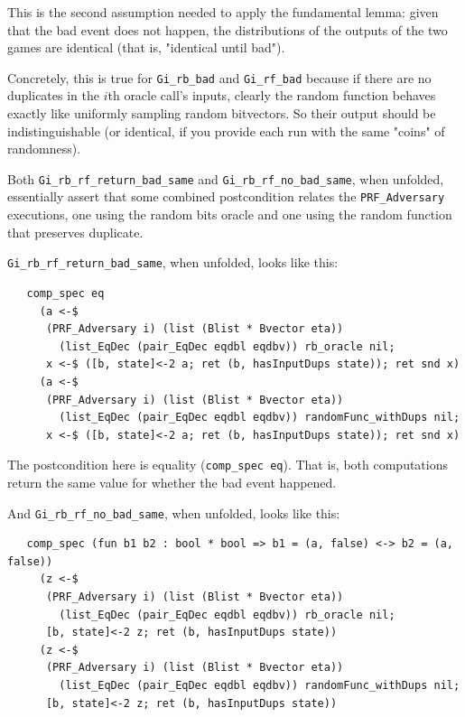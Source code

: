 \documentclass[12pt,lot, lof]{puthesis}
\newcommand{\li} {\lstinline}
\begin{document}
{\begin{enumerate}
This is the second assumption needed to apply the fundamental lemma: given that the bad event does not happen, the distributions of the outputs of the two games are identical (that is, "identical until bad").

Concretely, this is true for \li|Gi_rb_bad| and \li|Gi_rf_bad| because if there are no duplicates in the $i$th oracle call's inputs, clearly the random function behaves exactly like uniformly sampling random bitvectors. So their output should be indistinguishable (or identical, if you provide each run with the same "coins" of randomness).

\end{enumerate}



Both \li|Gi_rb_rf_return_bad_same| and \li|Gi_rb_rf_no_bad_same|, when unfolded, essentially assert that some combined postcondition relates the \li|PRF_Adversary| executions, one using the random bits oracle and one using the random function that preserves duplicate.

\li|Gi_rb_rf_return_bad_same|, when unfolded, looks like this:

\begin{lstlisting}
   comp_spec eq
     (a <-$
      (PRF_Adversary i) (list (Blist * Bvector eta))
        (list_EqDec (pair_EqDec eqdbl eqdbv)) rb_oracle nil;
      x <-$ ([b, state]<-2 a; ret (b, hasInputDups state)); ret snd x)
     (a <-$
      (PRF_Adversary i) (list (Blist * Bvector eta))
        (list_EqDec (pair_EqDec eqdbl eqdbv)) randomFunc_withDups nil;
      x <-$ ([b, state]<-2 a; ret (b, hasInputDups state)); ret snd x)
\end{lstlisting}      

The postcondition here is equality (\li|comp_spec eq|). That is, both computations return the same value for whether the bad event happened.

And \li|Gi_rb_rf_no_bad_same|, when unfolded, looks like this:

\begin{lstlisting}
   comp_spec (fun b1 b2 : bool * bool => b1 = (a, false) <-> b2 = (a, false))
     (z <-$
      (PRF_Adversary i) (list (Blist * Bvector eta))
        (list_EqDec (pair_EqDec eqdbl eqdbv)) rb_oracle nil;
      [b, state]<-2 z; ret (b, hasInputDups state))
     (z <-$
      (PRF_Adversary i) (list (Blist * Bvector eta))
        (list_EqDec (pair_EqDec eqdbl eqdbv)) randomFunc_withDups nil;
      [b, state]<-2 z; ret (b, hasInputDups state))
\end{lstlisting}      

}
\end{document}
